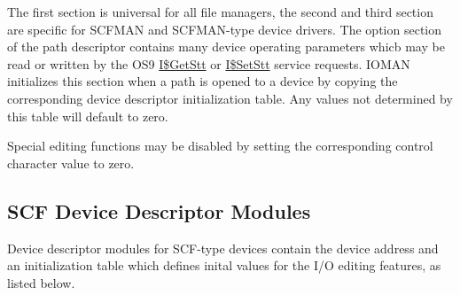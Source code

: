 \documentclass[
]{article}
\begin{document}
The first section is universal for all file managers, the second and
third section are specific for SCFMAN and SCFMAN-type device drivers.
The option section of the path descriptor contains many device operating
parameters whicb may be read or written by the OS9
\hyperref[i.getstt]{I\$GetStt} or \hyperref[i.setstt]{I\$SetStt} service
requests. IOMAN initializes this section when a path is opened to a
device by copying the corresponding device descriptor initialization
table. Any values not determined by this table will default to zero.

Special editing functions may be disabled by setting the corresponding
control character value to zero.

\subsection{SCF Device Descriptor Modules}

Device descriptor modules for SCF-type devices contain the device
address and an initialization table which defines inital values for the
I/O editing features, as listed below.
\end{document}
